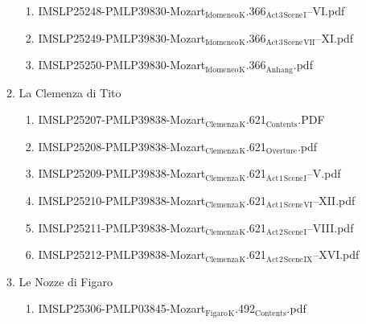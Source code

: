 \documentclass[11pt]{article}
\begin{document}
\begin{enumerate}
\begin{enumerate}
\begin{enumerate}
\item IMSLP25248-PMLP39830-Mozart$_{\text{Idomeneo}}$$_{\text{K}}$.366$_{\text{Act}}$$_{\text{3}}$$_{\text{Scene}}$$_{\text{I}}$--VI.pdf
\label{sec-1-1-1-1-44-49-3-7-7}

\item IMSLP25249-PMLP39830-Mozart$_{\text{Idomeneo}}$$_{\text{K}}$.366$_{\text{Act}}$$_{\text{3}}$$_{\text{Scene}}$$_{\text{VII}}$--XI.pdf
\label{sec-1-1-1-1-44-49-3-7-8}

\item IMSLP25250-PMLP39830-Mozart$_{\text{Idomeneo}}$$_{\text{K}}$.366$_{\text{Anhang}}$.pdf
\label{sec-1-1-1-1-44-49-3-7-9}
\end{enumerate}

\item La Clemenza di Tito
\label{sec-1-1-1-1-44-49-3-8}
\begin{enumerate}
\item IMSLP25207-PMLP39838-Mozart$_{\text{Clemenza}}$$_{\text{K}}$.621$_{\text{Contents}}$.PDF
\label{sec-1-1-1-1-44-49-3-8-1}

\item IMSLP25208-PMLP39838-Mozart$_{\text{Clemenza}}$$_{\text{K}}$.621$_{\text{Overture}}$.pdf
\label{sec-1-1-1-1-44-49-3-8-2}

\item IMSLP25209-PMLP39838-Mozart$_{\text{Clemenza}}$$_{\text{K}}$.621$_{\text{Act}}$$_{\text{1}}$$_{\text{Scene}}$$_{\text{I}}$--V.pdf
\label{sec-1-1-1-1-44-49-3-8-3}

\item IMSLP25210-PMLP39838-Mozart$_{\text{Clemenza}}$$_{\text{K}}$.621$_{\text{Act}}$$_{\text{1}}$$_{\text{Scene}}$$_{\text{VI}}$--XII.pdf
\label{sec-1-1-1-1-44-49-3-8-4}

\item IMSLP25211-PMLP39838-Mozart$_{\text{Clemenza}}$$_{\text{K}}$.621$_{\text{Act}}$$_{\text{2}}$$_{\text{Scene}}$$_{\text{I}}$--VIII.pdf
\label{sec-1-1-1-1-44-49-3-8-5}

\item IMSLP25212-PMLP39838-Mozart$_{\text{Clemenza}}$$_{\text{K}}$.621$_{\text{Act}}$$_{\text{2}}$$_{\text{Scene}}$$_{\text{IX}}$--XVI.pdf
\label{sec-1-1-1-1-44-49-3-8-6}
\end{enumerate}

\item Le Nozze di Figaro
\label{sec-1-1-1-1-44-49-3-9}
\begin{enumerate}
\item IMSLP25306-PMLP03845-Mozart$_{\text{Figaro}}$$_{\text{K}}$.492$_{\text{Contents}}$.pdf
\label{sec-1-1-1-1-44-49-3-9-1}


\end{enumerate}
\end{enumerate}
\end{enumerate}
\end{document}
